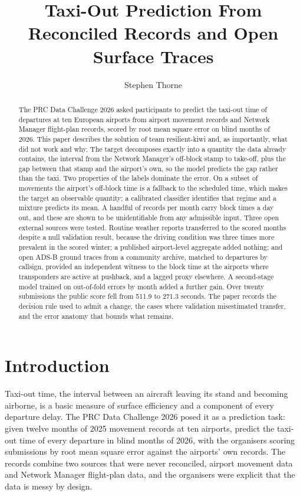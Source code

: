 \documentclass[
  manuscript=article,
  layout=preprint,
  year=2027,
  volume=x,
]{extra/joas}
\title{Taxi-Out Prediction From Reconciled Records and Open Surface Traces}
\author{Stephen Thorne}
\affiliation{White Pearl Technology Group AB, Stockholm, Sweden}
\begin{document}
\begin{abstract}
The PRC Data Challenge 2026 asked participants to predict the taxi-out time of departures at ten European airports from airport movement records and Network Manager flight-plan records, scored by root mean square error on blind months of 2026. This paper describes the solution of team resilient-kiwi and, as importantly, what did not work and why. The target decomposes exactly into a quantity the data already contains, the interval from the Network Manager's off-block stamp to take-off, plus the gap between that stamp and the airport's own, so the model predicts the gap rather than the taxi. Two properties of the labels dominate the error. On a subset of movements the airport's off-block time is a fallback to the scheduled time, which makes the target an observable quantity; a calibrated classifier identifies that regime and a mixture predicts its mean. A handful of records per month carry block times a day out, and these are shown to be unidentifiable from any admissible input. Three open external sources were tested. Routine weather reports transferred to the scored months despite a null validation result, because the driving condition was three times more prevalent in the scored winter; a published airport-level aggregate added nothing; and open ADS-B ground traces from a community archive, matched to departures by callsign, provided an independent witness to the block time at the airports where transponders are active at pushback, and a lagged proxy elsewhere. A second-stage model trained on out-of-fold errors by month added a further gain. Over twenty submissions the public score fell from 511.9 to 271.3 seconds. The paper records the decision rule used to admit a change, the cases where validation misestimated transfer, and the error anatomy that bounds what remains.
\end{abstract}


\section{Introduction}

Taxi-out time, the interval between an aircraft leaving its stand and becoming airborne, is a basic measure of surface efficiency and a component of every departure delay. The PRC Data Challenge 2026 \cite{prc2026} posed it as a prediction task: given twelve months of 2025 movement records at ten airports, predict the taxi-out time of every departure in blind months of 2026, with the organisers scoring submissions by root mean square error against the airports' own records. The records combine two sources that were never reconciled, airport movement data and Network Manager flight-plan data, and the organisers were explicit that the data is messy by design.
\end{document}
